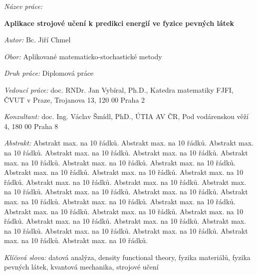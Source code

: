 \documentclass[11pt,oneside,czech,american]{book} %
\theoremstyle{plain}
\theoremstyle{definition}
\begin{document}

%
\begin{onehalfspace}
	\noindent \emph{Název práce:}
	
	\noindent \textbf{Aplikace strojové učení k predikci energií ve fyzice pevných látek}
\end{onehalfspace}

\bigskip{}

\noindent \emph{Autor:} Bc. Jiří Chmel

\bigskip{}

\noindent \emph{Obor:} Aplikované matematicko-stochastické metody\bigskip{}



\noindent \emph{Druh práce:} Diplomová práce

\bigskip{}

\noindent \emph{Vedoucí práce:} doc. RNDr. Jan Vybíral, Ph.D., Katedra matematiky FJFI, ČVUT v Praze, Trojanova 13, 120 00 Praha 2

\bigskip{}

\noindent \emph{Konzultant:} doc. Ing. Václav Šmídl, PhD., ÚTIA AV ČR, Pod vodárenskou věží 4, 180 00 Praha 8

\bigskip{}

\noindent \emph{Abstrakt:} Abstrakt max. na 10 řádků. Abstrakt max.
na 10 řádků. Abstrakt max. na 10 řádků. Abstrakt max. na 10 řádků.
Abstrakt max. na 10 řádků. Abstrakt max. na 10 řádků. Abstrakt max.
na 10 řádků. Abstrakt max. na 10 řádků. Abstrakt max. na 10 řádků.
Abstrakt max. na 10 řádků. Abstrakt max. na 10 řádků. Abstrakt max.
na 10 řádků. Abstrakt max. na 10 řádků. Abstrakt max. na 10 řádků.
Abstrakt max. na 10 řádků. Abstrakt max. na 10 řádků. Abstrakt max.
na 10 řádků. Abstrakt max. na 10 řádků. Abstrakt max. na 10 řádků.
Abstrakt max. na 10 řádků. Abstrakt max. na 10 řádků. Abstrakt max.
na 10 řádků. Abstrakt max. na 10 řádků. Abstrakt max. na 10 řádků.
Abstrakt max. na 10 řádků. Abstrakt max. na 10 řádků. Abstrakt max.
na 10 řádků. Abstrakt max. na 10 řádků. Abstrakt max. na 10 řádků. 

\bigskip{}

\noindent \emph{Klíčová slova:} datová analýza, density functional theory, fyzika materiálů, fyzika pevných látek, kvantová mechanika, strojové učení

%
\vfill{}
~
\end{document}
